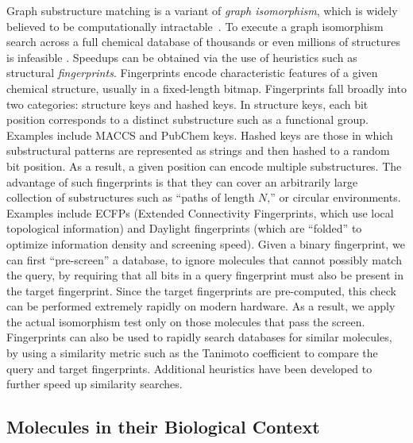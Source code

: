 \documentclass{../sig-alternate}
\begin{document}
Graph substructure matching is a variant of \emph{graph isomorphism},
which is widely believed to be computationally
intractable~\cite{cordella2001}. To execute a graph isomorphism search
across a full chemical database of thousands or even millions of
structures is infeasible \cite{Weininger:2011ly}. Speedups can be
obtained via the use of heuristics such as structural
\emph{fingerprints}. Fingerprints encode characteristic features of a
given chemical structure, usually in a fixed-length
bitmap. Fingerprints fall broadly into two categories: structure keys
and hashed keys. In structure keys, each bit position corresponds to a
distinct substructure such as a functional group. Examples include MACCS and PubChem
keys. Hashed keys are those in which substructural patterns
are represented as strings and then hashed to a random bit
position. As a result, a given position can encode multiple
substructures. The advantage of such fingerprints is that they can
cover an arbitrarily large collection of substructures such as ``paths
of length $N$,'' or circular environments. Examples include
ECFPs (Extended Connectivity Fingerprints, which use local topological
information) and Daylight fingerprints (which are ``folded'' to
optimize information density and screening speed).
Given a binary fingerprint, we can first ``pre-screen'' a database, to
ignore molecules that cannot possibly match the query,
 by requiring that all bits in a query fingerprint must also
be present in the target fingerprint. Since the target fingerprints
are pre-computed, this check can be performed extremely
rapidly on modern hardware. As a result, we apply the actual
isomorphism test only on those molecules that pass the
screen. Fingerprints can also be used to rapidly search databases for
similar molecules, by using a similarity metric such as the
Tanimoto coefficient to compare the query and target
fingerprints. Additional heuristics have been developed
\cite{Swamidass:2007ve} to further speed up similarity searches.

\subsection{Molecules in their Biological Context}
\label{sec:prof-ident}
\end{document}
